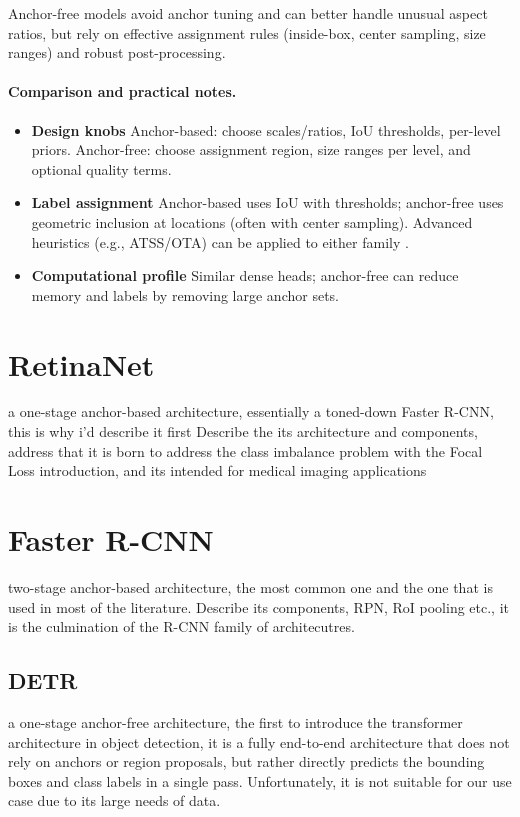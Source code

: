 Anchor-free models avoid anchor tuning and can better handle unusual aspect ratios, but rely on effective assignment rules (inside-box, center sampling, size ranges) and robust post-processing.

\paragraph{Comparison and practical notes.}
\begin{itemize}
    \item \textbf{Design knobs} Anchor-based: choose scales/ratios, IoU thresholds, per-level priors. Anchor-free: choose assignment region, size ranges per level, and optional quality terms.
    \item \textbf{Label assignment} Anchor-based uses $\mathrm{IoU}$ with thresholds; anchor-free uses geometric inclusion at locations (often with center sampling). Advanced heuristics (e.g., ATSS/OTA) can be applied to either family \cite{zhang2020atss,ge2021ota}.
    \item \textbf{Computational profile} Similar dense heads; anchor-free can reduce memory and labels by removing large anchor sets.
\end{itemize}



\section{RetinaNet}
a one-stage anchor-based architecture, essentially a toned-down Faster R-CNN, this is why i'd describe it first
Describe the its architecture and components, address that it is born to address the class imbalance problem with the Focal Loss introduction, and its intended for medical imaging applications

\section{Faster R-CNN}
two-stage anchor-based architecture, the most common one and the one that is used in most of the literature.
Describe its components, RPN, RoI pooling etc., it is the culmination of the R-CNN family of architecutres.

\subsection{DETR}
a one-stage anchor-free architecture, the first to introduce the transformer architecture in object detection, it is a fully end-to-end architecture that does not rely on anchors or region proposals, but rather directly predicts the bounding boxes and class labels in a single pass. Unfortunately, it is not suitable for our use case due to its large needs of data.

